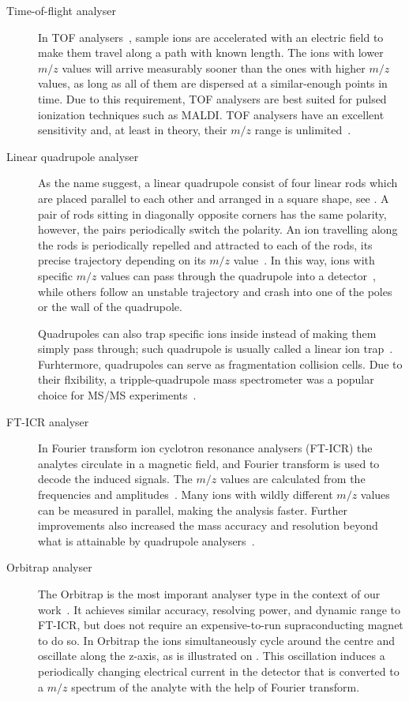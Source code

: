 \begin{description}
  \item[Time-of-flight analyser] In TOF analysers~\cite{stephens1946pulsed}, sample ions are accelerated with an electric field to make them travel along a path with known length. The ions with lower \(m/z\) values will arrive measurably sooner than the ones with higher \(m/z\) values, as long as all of them are dispersed at a similar-enough points in time. Due to this requirement, TOF analysers are best suited for pulsed ionization techniques such as MALDI\@. TOF analysers have an excellent sensitivity and, at least in theory, their \(m/z\) range is unlimited~\cite{fuerstenau1995molecular}.
  \item[Linear quadrupole analyser] As the name suggest, a linear quadrupole consist of four linear rods which are placed parallel to each other and arranged in a square shape, see . A pair of rods sitting in diagonally opposite corners has the same polarity, however, the pairs periodically switch the polarity. An ion travelling along the rods is periodically repelled and attracted to each of the rods, its precise trajectory depending on its \(m/z\) value~\cite{paul1990electromagnetic}. In this way, ions with specific \(m/z\) values can pass through the quadrupole into a detector~\cite{paul1953neues}, while others follow an unstable trajectory and crash into one of the poles or the wall of the quadrupole.

    Quadrupoles can also trap specific ions inside instead of making them simply pass through; such quadrupole is usually called a linear ion trap~\cite{mao2003h}. Furhtermore, quadrupoles can serve as fragmentation collision cells. Due to their flxibility, a tripple-quadrupole mass spectrometer was a popular choice for MS/MS experiments~\cite{yost1978selected}.
  \item[FT-ICR analyser] In Fourier transform ion cyclotron resonance analysers (FT-ICR) the analytes circulate in a magnetic field, and Fourier transform is used to decode the induced signals. The \(m/z\) values are calculated from the frequencies and amplitudes~\cite{comisarow1974fourier}. Many ions with wildly different \(m/z\) values can be measured in parallel, making the analysis faster. Further improvements also increased the mass accuracy and resolution beyond what is attainable by quadrupole analysers~\cite{amster1996fourier, easterling1999routine}.
  \item[Orbitrap analyser] The Orbitrap is the most imporant analyser type in the context of our work~\cite{hu2005orbitrap}. It achieves similar accuracy, resolving power, and dynamic range to FT-ICR, but does not require an expensive-to-run supraconducting magnet to do so. In Orbitrap the ions simultaneously cycle around the centre and oscillate along the z-axis, as is illustrated on . This oscillation induces a periodically changing electrical current in the detector that is converted to a \(m/z\) spectrum of the analyte with the help of Fourier transform.


\end{description}
